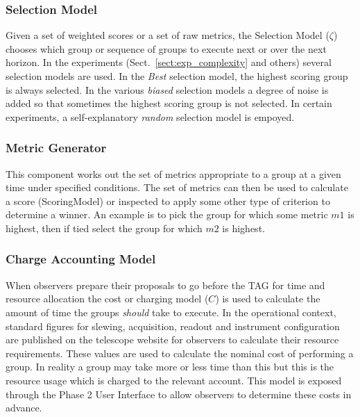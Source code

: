 \begin{itemize}
\end{itemize}

\subsubsection{Selection Model}
Given a set of weighted scores or a set of raw metrics, the Selection Model ($\zeta$) chooses which group or sequence of groups to execute next or over the next horizon.  In the experiments (Sect.~\ref{sect:exp_complexity} and others) several selection models are used. In the \emph{Best} selection model, the highest scoring group is always selected. In the various \emph{biased} selection models a degree of noise is added so that sometimes the highest scoring group is not selected. In certain experiments, a self-explanatory \emph{random} selection model is empoyed.

\subsubsection{Metric Generator}
This component works out the set of metrics appropriate to a group at a given time under specified conditions. The set of metrics can then be used to calculate a score (ScoringModel) or inspected to apply some other type of criterion to determine a winner. An example is to pick the group for which some metric $m1$ is highest, then if tied select the group for which $m2$ is highest.

\subsubsection{Charge Accounting Model}
When observers prepare their proposals to go before the TAG for time and resource allocation the cost or charging model ($C$) is  used to calculate the amount of time the groups \emph{should} take to execute. In the operational context, standard figures for slewing, acquisition, readout and instrument configuration are published on the telescope website for observers to calculate their resource requirements. These values are used to calculate the nominal cost of performing a group. In reality a group may take more or less time than this but this is the resource usage which is charged to the relevant account. This model is exposed through the Phase 2 User Interface to allow observers to determine these costs in advance.


